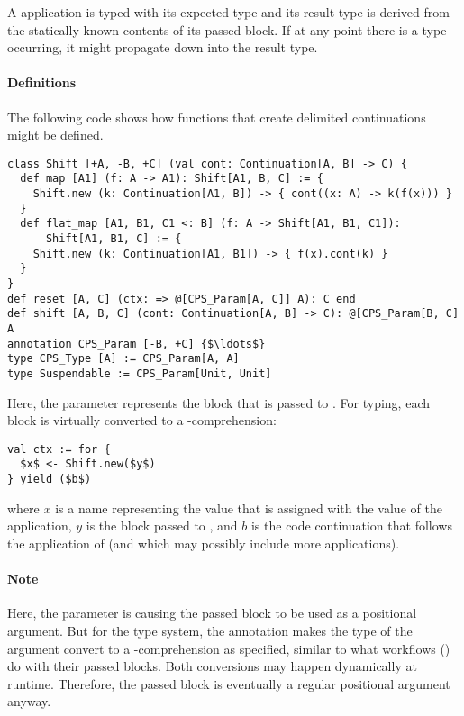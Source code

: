 A  application is typed with its expected type and its result type is derived from the statically known contents of its passed block. If at any point there is a  type occurring, it might propagate down into the result type. 

\paragraph{Definitions}
The following code shows how functions that create delimited continuations might be defined. 
\begin{lstlisting}
class Shift [+A, -B, +C] (val cont: Continuation[A, B] -> C) {
  def map [A1] (f: A -> A1): Shift[A1, B, C] := {
    Shift.new (k: Continuation[A1, B]) -> { cont((x: A) -> k(f(x))) }
  }
  def flat_map [A1, B1, C1 <: B] (f: A -> Shift[A1, B1, C1]): 
      Shift[A1, B1, C] := {
    Shift.new (k: Continuation[A1, B1]) -> { f(x).cont(k) }
  }
}
def reset [A, C] (ctx: => @[CPS_Param[A, C]] A): C end
def shift [A, B, C] (cont: Continuation[A, B] -> C): @[CPS_Param[B, C] A
annotation CPS_Param [-B, +C] {$\ldots$}
type CPS_Type [A] := CPS_Param[A, A]
type Suspendable := CPS_Param[Unit, Unit]
\end{lstlisting}

Here, the  parameter represents the block that is passed to . For typing, each  block is virtually converted to a -comprehension:
\begin{lstlisting}
val ctx := for {
  $x$ <- Shift.new($y$)
} yield ($b$)
\end{lstlisting}
where $x$ is a name representing the value that is assigned with the value of the  application, $y$ is the block passed to , and $b$ is the code continuation that follows the application of  (and which may possibly include more  applications). 

\paragraph{Note}
Here, the  parameter is causing the passed block to be used as a positional argument. But for the type system, the annotation  makes the type of the argument convert to a -comprehension as specified, similar to what workflows () do with their passed blocks. Both conversions may happen dynamically at runtime. Therefore, the passed block is eventually a regular positional argument anyway. 

